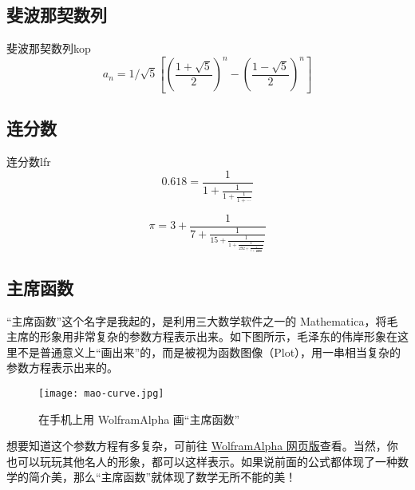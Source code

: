 \documentclass[12pt, cn]{elegantart}
\begin{document}
\subsection{斐波那契数列}

\begin{theorem}{斐波那契数列}{kop}
	\begin{equation}
		a_{n}=1 / \sqrt{5}\left[\left(\frac{1+\sqrt{5}}{2}\right)^{n}-\left(\frac{1-\sqrt{5}}{2}\right)^{n}\right]
	\end{equation}
\end{theorem}

\subsection{连分数}
\begin{theorem}{连分数}{lfr}
	\begin{equation}
	0.618=\frac{1}{1+\frac{1}{1+\frac{1}{1+\cdots}}}
	\end{equation}

	\begin{equation}
	\pi=3+\frac{1}{7+\frac{1}{15+\frac{1}{1+\frac{1}{292+\frac{1}{1+\frac{1}{1+\ddots}}}}}}
	\end{equation}
\end{theorem}

\subsection{主席函数}

“主席函数”这个名字是我起的，是利用三大数学软件之一的 Mathematica，将毛主席的形象用非常复杂的参数方程表示出来。如下图所示，毛泽东的伟岸形象在这里不是普通意义上“画出来”的，而是被视为函数图像（Plot），用一串相当复杂的参数方程表示出来的。

\begin{figure}[h]
\centering
\texttt{[image: mao-curve.jpg]}
\caption{在手机上用 WolframAlpha 画“主席函数”}
\end{figure}

想要知道这个参数方程有多复杂，可前往 \href{https://www.wolframalpha.com/input/?i=Mao+curve}{WolframAlpha 网页版}查看。当然，你也可以玩玩其他名人的形象，都可以这样表示。如果说前面的公式都体现了一种数学的简介美，那么“主席函数”就体现了数学无所不能的美！

\nocite{*}
{}



\clearpage

\end{document}
